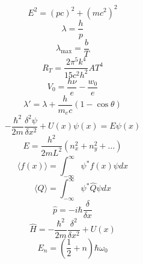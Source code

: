 \documentclass{article}
\begin{document}
    \begin{equation}
        E^2 = (pc)^2 + (mc^2)^2
    \end{equation}
    \begin{equation}
        \lambda = \frac{h}{p}
    \end{equation}
    \begin{equation}
        \lambda_{\text{max}} = \frac{b}{T}
    \end{equation}
    \begin{equation}
        R_T = \frac{2\pi^5k^4}{15c^2h^2} A T^4
    \end{equation}
    \begin{equation}
        V_0 = \frac{h\nu}{e} - \frac{w_0}{e}
    \end{equation}
    \begin{equation}
        \lambda' = \lambda + \frac{h}{m_ec}(1-\cos\theta)
    \end{equation}
    \begin{equation}
        -\frac{\hbar^2}{2m} \frac{\delta^2 \psi}{\delta x^2} + U(x)\psi(x) = E\psi(x)
    \end{equation}
    \begin{equation}
        E = \frac{h^2}{2mL^2}(n_x^2 + n_y^2 + \dots)
    \end{equation}
    \begin{equation}
        \langle f(x) \rangle = \int_{-\infty}^{\infty} \psi^* f(x) \psi dx
    \end{equation}
    \begin{equation}
        \langle Q \rangle = \int_{-\infty}^{\infty} \psi^* \hat Q \psi dx
    \end{equation}
    \begin{equation}
        \hat p = -i\hbar \frac{\delta}{\delta x}
    \end{equation}
    \begin{equation}
        \hat H = -\frac{\hbar^2}{2m} \frac{\delta^2}{\delta x^2} + U(x)
    \end{equation}
    \begin{equation}
        E_n = \left(\frac{1}{2} + n\right) \hbar \omega_0
    \end{equation}
\end{document}

